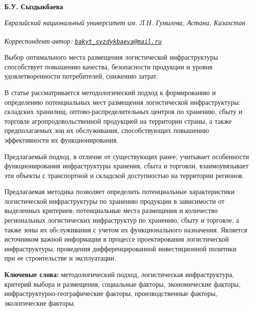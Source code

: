
\begin{articleheader}

{\bfseries
Б.У. Сыздыкбаева\textsuperscript{\envelope } }
\end{articleheader}

\begin{affiliation}
\emph{Евразийский национальный университет им. Л.Н. Гумилева, Астана, Казахстан}

\raggedright \textsuperscript{\envelope }{\em Корреспондент-автор: \href{mailto:bakyt_syzdykbaeva@mail.ru}{\nolinkurl{bakyt\_syzdykbaeva@mail.ru}}}
\end{affiliation}

Выбор оптимального места размещения логистической инфраструктуры
способствует повышению качества, безопасности продукции и уровня
удовлетворенности потребителей, снижению затрат.

В статье рассматривается методологический подход к формированию и
определению потенциальных мест размещения логистической инфраструктуры:
складских хранилищ, оптово-распределительных центров по хранению, сбыту
и торговле агропродовольственной продукцией на территории страны, а
также предполагаемых зон их обслуживания, способствующих повышению
эффективности их функционирования.

Предлагаемый подход, в отличие от существующих ранее, учитывает
особенности функционирования инфраструктуры хранения, сбыта и торговли,
взаимоувязывает эти объекты с транспортной и складской доступностью на
территории регионов.

Предлагаемая методика позволяет определить потенциальные характеристики
логистической инфраструктуры по хранению продукции в зависимости от
выделенных критериев; потенциальные места размещения и количество
региональных логистических инфраструктур по хранению, сбыту и торговле,
а также зоны их обcлуживания с учетом их функционального назначения.
Является источником важной информации в процессе проектирования
логистической инфраструктуры, проведения дифференцированной
инвестиционной политики при ее строительстве и эксплуатации.

{\bfseries Ключевые слова:} методологический подход, логистическая
инфраструктура, критерий выбора и размещения, социальные факторы,
экономические факторы, инфраструктурно-географические факторы,
производственные факторы, экологические факторы.

